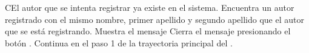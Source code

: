 
\begin{UCtrayectoriaA}{C}{El autor que se intenta registrar ya existe en el sistema.}
    \UCpaso Encuentra un autor registrado con el mismo nombre, primer apellido y segundo apellido que el autor que se está registrando.
    \UCpaso Muestra el mensaje 
    \UCpaso[\UCactor] Cierra el mensaje presionando el botón .
    \UCpaso Continua en el paso 1 de la trayectoria principal del .
\end{UCtrayectoriaA}
